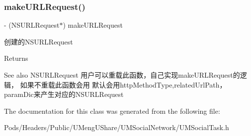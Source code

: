 \subsubsection{\texorpdfstring{make\+U\+R\+L\+Request()}{makeURLRequest()}\hspace{0.1cm}{\footnotesize\ttfamily [2/2]}}
{\footnotesize\ttfamily -\/ (N\+S\+U\+R\+L\+Request$\ast$) make\+U\+R\+L\+Request \begin{DoxyParamCaption}{ }\end{DoxyParamCaption}}

创建的\+N\+S\+U\+R\+L\+Request

\begin{DoxyReturn}{Returns}

\end{DoxyReturn}
\begin{DoxySeeAlso}{See also}
N\+S\+U\+R\+L\+Request  用户可以重载此函数，自己实现make\+U\+R\+L\+Request的逻辑， 如果不重载此函数会用 默认会用http\+Method\+Type,related\+Url\+Path，param\+Dic来产生对应的\+N\+S\+U\+R\+L\+Request 
\end{DoxySeeAlso}


The documentation for this class was generated from the following file\+:\begin{DoxyCompactItemize}
\item 
Pods/\+Headers/\+Public/\+U\+Meng\+U\+Share/\+U\+M\+Social\+Network/U\+M\+Social\+Task.\+h\end{DoxyCompactItemize}
